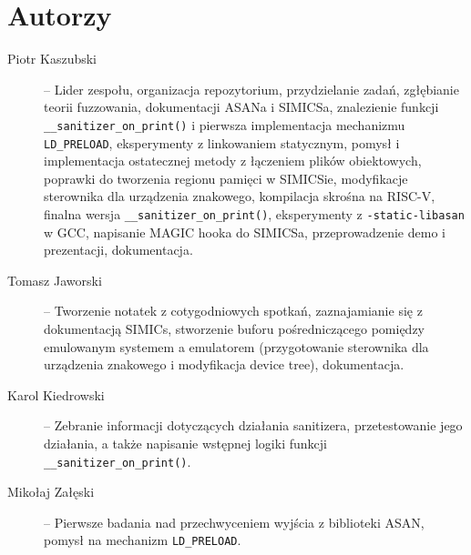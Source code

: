 \documentclass[../main.tex]{subfiles}
\begin{document}
\section{Autorzy}

\begin{description}
	\item [Piotr Kaszubski] --
		Lider zespołu, organizacja repozytorium, przydzielanie zadań,
		zgłębianie teorii fuzzowania, dokumentacji ASANa i SIMICSa, znalezienie
		funkcji \texttt{__sanitizer_on_print()} i pierwsza implementacja
		mechanizmu \texttt{LD_PRELOAD}, eksperymenty z linkowaniem
		statycznym, pomysł i implementacja ostatecznej metody z łączeniem
		plików obiektowych, poprawki do tworzenia regionu pamięci w SIMICSie,
		modyfikacje sterownika dla urządzenia znakowego, kompilacja skrośna na
		RISC-V, finalna wersja \texttt{__sanitizer_on_print()},
		eksperymenty z \texttt{-static-libasan} w GCC, napisanie MAGIC
		hooka do SIMICSa, przeprowadzenie demo i prezentacji, dokumentacja.
	\item [Tomasz Jaworski] --
		Tworzenie notatek z cotygodniowych spotkań, zaznajamianie się z
		dokumentacją SIMICs, stworzenie buforu pośredniczącego pomiędzy
		emulowanym systemem a emulatorem (przygotowanie sterownika dla
		urządzenia znakowego i modyfikacja device tree), dokumentacja.
	\item [Karol Kiedrowski] --
		Zebranie informacji dotyczących działania sanitizera, przetestowanie
		jego działania, a także napisanie wstępnej logiki funkcji
		\texttt{__sanitizer_on_print()}.
	\item [Mikołaj Załęski] --
		Pierwsze badania nad przechwyceniem wyjścia z biblioteki ASAN, pomysł
		na mechanizm \texttt{LD_PRELOAD}.
\end{description}
\end{document}
